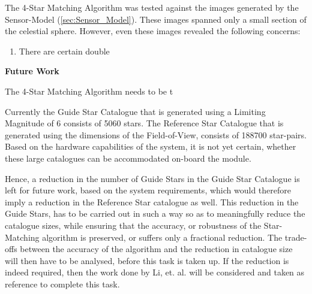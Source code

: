 \documentclass[../../main.tex]{subfiles}
\begin{document}



The 4-Star Matching Algorithm was tested against the images generated by the Sensor-Model (\ref{sec:Sensor_Model}). These images spanned only a small section of the celestial sphere. However, even these images revealed the following concerns:
\begin{enumerate}
    \item There are certain double
\end{enumerate}

\textbf{Future Work}

The 4-Star Matching Algorithm needs to be t

Currently the Guide Star Catalogue that is generated using a Limiting Magnitude of 6 consists of 5060 stars. The Reference Star Catalogue that is generated using the dimensions of the Field-of-View, consists of 188700 star-pairs. 
Based on the hardware capabilities of the system, it is not yet certain, whether these large catalogues can be accommodated on-board the module.

Hence, a reduction in the number of Guide Stars in the Guide Star Catalogue is left for future work, based on the system requirements, which would therefore imply a reduction in the Reference Star catalogue as well.
This reduction in the Guide Stars, has to be carried out in such a way so as to meaningfully reduce the catalogue sizes, while ensuring that the accuracy, or robustness of the Star-Matching algorithm is preserved, or suffers only a fractional reduction. The trade-offs between the accuracy of the algorithm and the reduction in catalogue size will then have to be analysed, before this task is taken up.
If the reduction is indeed required, then the work done by Li, et. al. \cite{li2014new} will be considered and taken as reference to complete this task.

\end{document}
